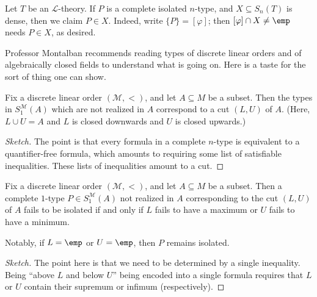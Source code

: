 \documentclass[../notes.tex]{subfiles}
\begin{document}
\begin{remark}
	Let $T$ be an $\mathcal L$-theory. If $P$ is a complete isolated $n$-type, and $X\subseteq S_n(T)$ is dense, then we claim $P\in X$. Indeed, write $\{P\}=[\varphi]$; then $[\varphi]\cap X\ne\emp$ needs $P\in X$, as desired.
\end{remark}
Professor Montalban recommends reading types of discrete linear orders and of algebraically closed fields to understand what is going on. Here is a taste for the sort of thing one can show.
\begin{proposition}
	Fix a discrete linear order $(\mathcal M,<)$, and let $A\subseteq M$ be a subset. Then the types in $S_1^{\mathcal M}(A)$ which are not realized in $A$ correspond to a cut $(L,U)$ of $A$. (Here, $L\cup U=A$ and $L$ is closed downwards and $U$ is closed upwards.)
\end{proposition}
\begin{proof}[Sketch]
	The point is that every formula in a complete $n$-type is equivalent to a quantifier-free formula, which amounts to requiring some list of satisfiable inequalities. These lists of inequalities amount to a cut.
\end{proof}
\begin{proposition}
	Fix a discrete linear order $(\mathcal M,<)$, and let $A\subseteq M$ be a subset. Then a complete $1$-type $P\in S_1^{\mathcal M}(A)$ not realized in $A$ corresponding to the cut $(L,U)$ of $A$ fails to be isolated if and only if $L$ fails to have a maximum or $U$ fails to have a minimum.
\end{proposition}
Notably, if $L=\emp$ or $U=\emp$, then $P$ remains isolated.
\begin{proof}[Sketch]
	The point here is that we need to be determined by a single inequality. Being ``above $L$ and below $U$'' being encoded into a single formula requires that $L$ or $U$ contain their supremum or infimum (respectively).
\end{proof}
\end{document}
